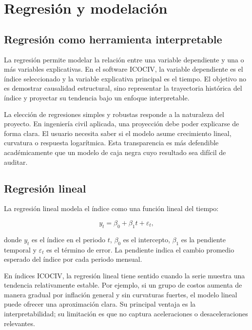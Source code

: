 \section{Regresión y modelación}

\subsection{Regresión como herramienta interpretable}

La regresión permite modelar la relación entre una variable dependiente y una o más variables explicativas. En el software ICOCIV, la variable dependiente es el índice seleccionado y la variable explicativa principal es el tiempo. El objetivo no es demostrar causalidad estructural, sino representar la trayectoria histórica del índice y proyectar su tendencia bajo un enfoque interpretable.

La elección de regresiones simples y robustas responde a la naturaleza del proyecto. En ingeniería civil aplicada, una proyección debe poder explicarse de forma clara. El usuario necesita saber si el modelo asume crecimiento lineal, curvatura o respuesta logarítmica. Esta transparencia es más defendible académicamente que un modelo de caja negra cuyo resultado sea difícil de auditar.

\subsection{Regresión lineal}

La regresión lineal modela el índice como una función lineal del tiempo:

\begin{equation}
    y_t = \beta_0 + \beta_1 t + \varepsilon_t,
    \label{eq:regresion_lineal}
\end{equation}

donde \(y_t\) es el índice en el periodo \(t\), \(\beta_0\) es el intercepto, \(\beta_1\) es la pendiente temporal y \(\varepsilon_t\) es el término de error. La pendiente indica el cambio promedio esperado del índice por cada periodo mensual.

En índices ICOCIV, la regresión lineal tiene sentido cuando la serie muestra una tendencia relativamente estable. Por ejemplo, si un grupo de costos aumenta de manera gradual por inflación general y sin curvaturas fuertes, el modelo lineal puede ofrecer una aproximación clara. Su principal ventaja es la interpretabilidad; su limitación es que no captura aceleraciones o desaceleraciones relevantes.

